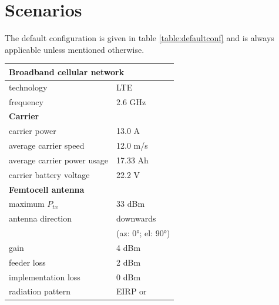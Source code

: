 \documentclass[twocolumn]{phdsymp} %
\begin{document}
\section{Scenarios}
The default configuration is given in table \ref{table:defaultconf} and is always applicable unless mentioned otherwise. 

\begin{table}[!htb]
\centering
\begin{tabular}[t]{ll}
        \toprule
        \multicolumn{2}{l}{\textbf{Broadband cellular network}} \\
        \hline
        \hspace{3mm}  technology        & LTE     \\
        \hspace{3mm}  frequency         & 2.6 GHz \\
        \hline
        \multicolumn{2}{l}{\textbf{Carrier}} \\
        \hline  
        \hspace{3mm}  carrier power        & 13.0 A   \\
        \hspace{3mm}  average carrier speed        & 12.0 m/s \\
        \hspace{3mm}  average carrier power usage      & 17.33 Ah    \\
        \hspace{3mm}  carrier battery voltage       & 22.2 V \\
        \hline
        \multicolumn{2}{l}{\textbf{Femtocell antenna}} \\
        \hline  
        \hspace{3mm}  maximum $P_{tx}$          & 33 dBm   \\
        \hspace{3mm}  antenna  direction        & downwards   \\ 
        \hspace{3mm}                            & (az: \ang{0}; el: \ang{90})    \\
        \hspace{3mm}  gain                      & 4 dBm   \\ 
        \hspace{3mm}  feeder loss               & 2 dBm   \\ 
        \hspace{3mm}  implementation loss       & 0 dBm   \\
        \hspace{3mm}  radiation pattern         & EIRP or\\

\end{tabular}
\end{table}
\end{document}
